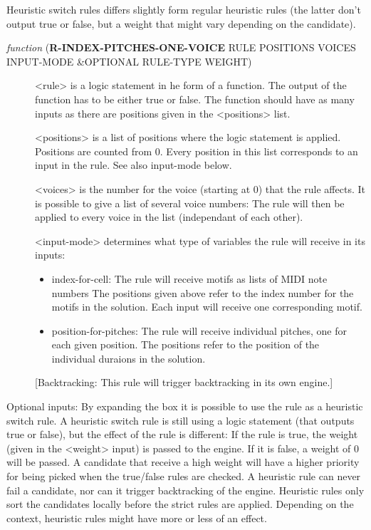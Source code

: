 Heuristic switch rules differs slightly form regular heuristic rules (the 
latter don't output true or false, but a weight that might vary depending
on the candidate).



\begin{description}
\item[{ \emph{function} (\textbf{R-INDEX-PITCHES-ONE-VOICE} RULE POSITIONS VOICES INPUT-MODE \&OPTIONAL RULE-TYPE WEIGHT)}] <rule> is a logic statement in he form of a function. The output of the 
function has to be either true or false. The function should have as many 
inputs as there are positions given in the <positions> list.

<positions> is a list of positions where the logic statement is applied.
Positions are counted from 0. Every position in this list corresponds to
an input in the rule. See also input-mode below.

<voices> is the number for the voice (starting at 0) that the rule affects. 
It is possible to give a list of several voice numbers: The rule will then 
be applied to every voice in the list (independant of each other).

<input-mode> determines what type of variables the rule will receive in 
its inputs:
\begin{itemize}
\item index-for-cell: The rule will receive motifs as lists of MIDI note 
numbers The positions given above refer to the index
number for the motifs in the solution. Each input 
will receive one corresponding motif.
\item position-for-pitches: The rule will receive individual
pitches, one for each given position.
The positions refer to the position
of the individual duraions in the solution.
\end{itemize}
[Backtracking: This rule will trigger backtracking in its own engine.]
\end{description}


Optional inputs:
By expanding the box it is possible to use the rule as a heuristic switch 
rule. A heuristic switch rule is still using a logic statement (that 
outputs true or false), but the effect of the rule is different: If the rule 
is true, the weight (given in the <weight> input) is passed to the engine. 
If it is false, a weight of 0 will be passed. A candidate that receive a 
high weight will have a higher priority for being picked when the true/false 
rules are checked. A heuristic rule can never fail a candidate, nor can it 
trigger backtracking of the engine. Heuristic rules only sort the 
candidates locally before the strict rules are applied. Depending on the 
context, heuristic rules might have more or less of an effect. 

